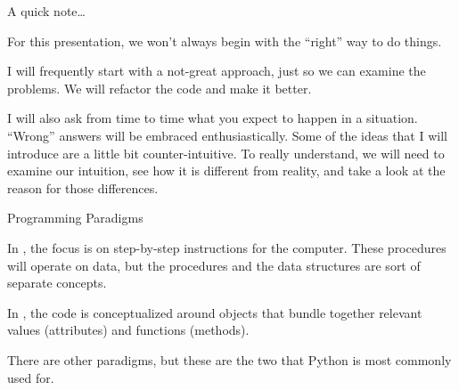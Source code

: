 \documentclass[aspectratio=149] {beamer}
\begin{document}
\begin{frame}[fragile]{A quick note\dots}

  For this presentation, we won't always begin with the ``right'' way to do things.

  \medskip

  I will frequently start with a not-great approach, just so we can examine the problems.
  We will refactor the code and make it better.
  
  \medskip \pause
  
  I will also ask from time to time what you expect to happen in a situation.
  ``Wrong'' answers will be embraced enthusiastically.  
  Some of the ideas that I will introduce are a little bit counter-intuitive.
  To really understand, we will need to examine our intuition,
  see how it is different from reality, 
  and take a look at the reason for those differences. 

\end{frame}





\begin{frame}[fragile]{Programming Paradigms}

  In ,
  the focus is on step-by-step instructions for the computer.
  These procedures will operate on data, but the procedures 
  and the data structures are sort of separate concepts.

  \bigskip \pause

  In ,
  the code is conceptualized around objects 
  that bundle together relevant values (attributes) and functions (methods).

  \bigskip \pause

  There are other paradigms, but these are the two that Python is most commonly used for.

\end{frame}
\end{document}
